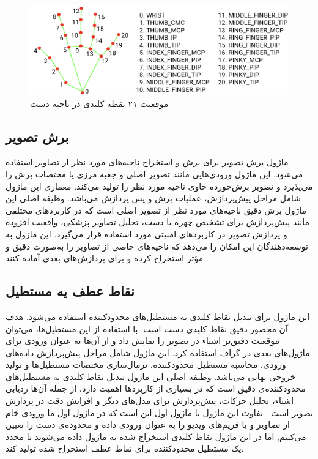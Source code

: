 \begin{figure}[h]
    \centering
    \includegraphics[width=1\textwidth]{hand-landmarks.png}
    \caption[موقعیت ۲۱ نقطه کلیدی در ناحیه دست]{موقعیت ۲۱ نقطه کلیدی در ناحیه دست \cite{zhang2020mediapipe}}
\end{figure}

\subsection{برش تصویر \protect{}}
ماژول برش تصویر برای برش و استخراج ناحیه‌های مورد نظر از تصاویر استفاده می‌شود. این ماژول ورودی‌هایی مانند تصویر اصلی و جعبه مرزی یا مختصات برش را می‌پذیرد و تصویر برش‌خورده حاوی ناحیه مورد 
نظر را تولید می‌کند. معماری این ماژول شامل مراحل پیش‌پردازش، عملیات برش  و پس‌ پردازش  می‌باشد. وظیفه اصلی این ماژول برش دقیق ناحیه‌های مورد نظر از تصویر اصلی است که در کاربردهای 
مختلفی مانند پیش‌پردازش برای تشخیص چهره یا دست، تحلیل تصاویر پزشکی، واقعیت افزوده و پردازش تصویر در کاربردهای امنیتی مورد استفاده قرار می‌گیرد. این ماژول به 
توسعه‌دهندگان این امکان را می‌دهد که ناحیه‌های خاصی از تصاویر را به‌صورت دقیق و مؤثر استخراج کرده و برای پردازش‌های بعدی آماده کنند \cite{zhang2020mediapipe}.

\subsection{نقاط عطف یه مستطیل\protect{}}
این ماژول برای تبدیل نقاط کلیدی به مستطیل‌های محدودکننده استفاده می‌شود. هدف آن محصور دقیق نقاط کلیدی دست است. با استفاده از این مستطیل‌ها، می‌توان موقعیت دقیق‌تر اشیاء در 
تصویر را نمایش داد و از آن‌ها به عنوان ورودی برای ماژول‌های بعدی در گراف استفاده کرد. این ماژول شامل مراحل پیش‌پردازش داده‌های ورودی، محاسبه مستطیل محدودکننده، نرمال‌سازی مختصات مستطیل‌ها و تولید خروجی نهایی 
 می‌باشد. وظیفه اصلی این ماژول تبدیل نقاط کلیدی به مستطیل‌های محدودکننده‌ی دقیق است که در بسیاری از کاربردها اهمیت دارد، از جمله آن‌ها ردیابی اشیاء، تحلیل حرکات، پیش‌پردازش برای مدل‌های دیگر و افزایش دقت در پردازش تصویر است \cite{zhang2020mediapipe}.
تفاوت این ماژول با ماژول اول این است که در ماژول اول ما ورودی خام از تصاویر و یا فریم‌های ویدیو را به عنوان ورودی داده و محدوده‌ی دست را تعیین ‌می‌کنیم, اما در 
این ماژول نقاط کلیدی استخراج شده به ماژول داده می‌شوند تا مجدد یک مستطیل محدودکننده برای نقاط عطف استخراح شده تولید کند.

